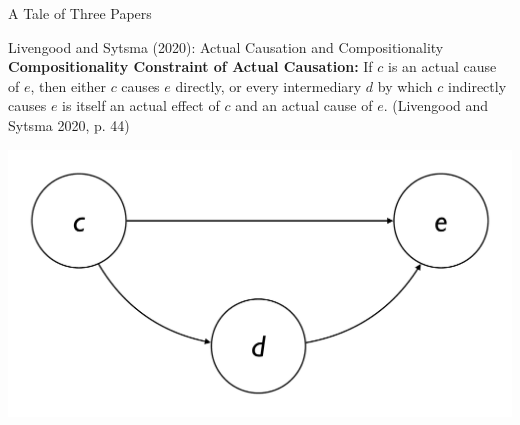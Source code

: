 \documentclass[xcolor=table,9pt,aspectratio=169]{beamer}
\begin{document}
\begin{frame}{\vspace*{10mm}A Tale of Three Papers}
\begin{multicols}{3}
\begin{center}
\end{center}
\end{multicols}
\end{frame}


\begin{frame}{\vspace*{10mm}Livengood and Sytsma (2020): Actual Causation and Compositionality}
\vspace*{-5mm}
\textbf{Compositionality Constraint of Actual Causation:} If $c$ is an actual cause of $e$, then either $c$ causes $e$ directly, or every intermediary $d$ by which $c$ indirectly causes $e$ is itself an actual effect of $c$ and an actual cause of $e$. (Livengood and Sytsma 2020, p. 44)
\begin{center}
   \includegraphics[width=0.5\linewidth]{figures/constraint.pdf}
\end{center}
\end{frame}
\end{document}
